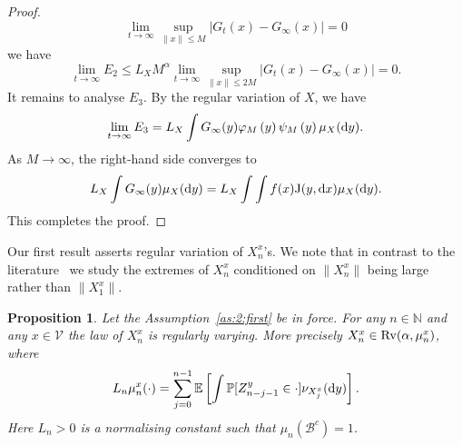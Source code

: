 \documentclass[preprint,12pt]{elsarticle}
\newtheorem{prop}[thm]{Proposition}
\theoremstyle{definition}
\theoremstyle{remark}
\newcommand{\bfx}{{ x}}
\newcommand{\xbf}{{ x}}
\newcommand{\ybf}{{ y}}
\newcommand{\Xbf}{{ X}}
\newcommand{\Zbf}{{ Z}}
\newcommand{\bfy}{{ y}}
\newcommand{\1}{{\mathbf 1}}
\numberwithin{equation}{section}
\newcommand{\Ebb}{\mathbb{E}}  %
\newcommand{\Nbb}{\mathbb{N}}
\newcommand{\Pbb}{\mathbb{P}}
\newcommand{\ud}{{\rm d}}
\newcommand{\Krm}{{\rm J}}
\newcommand{\Rvrm}{{\rm Rv}}
\newcommand{\Vcal}{\mathcal{V}}
\newcommand{\Bcal}{\mathcal{B}}
\begin{document}
\begin{proof}
\begin{equation*}
      \lim_{t \to \infty} \sup_{\|\bfx\| \leq M} \left| G_t(\bfx) - G_\infty(\bfx) \right| = 0 
    \end{equation*}  
    we have 
    \begin{equation*}
      \lim_{t\to \infty} E_2 \le L_{\Xbf} M^{\alpha} 
      \lim_{t\to \infty} \sup_{\|\xbf\| \le 2M} \left|G_t(\xbf) - G_\infty (\xbf)\right| =0.
    \end{equation*}
    It remains to analyse \( E_3 \). By the regular variation of \(\Xbf\), we have  
    \begin{equation*}  
      \lim_{t \to \infty} E_3 = 
      L_\Xbf \int G_\infty(\bfy) \varphi_M\left(\bfy\right) 
      \psi_M\left(\bfy\right) \mu_\Xbf(\ud \bfy).  
    \end{equation*}  
    As \( M \to \infty \), the right-hand side converges to  
    \begin{equation*}  
      L_\Xbf \int G_\infty(\bfy) \mu_\Xbf(\ud \bfy) = 
      L_\Xbf \int \int f(\bfx) \Krm(\bfy,\ud \bfx) \mu_\Xbf(\ud \bfy).  
    \end{equation*}  
    This completes the proof.
  \end{proof}

  Our first result asserts regular variation of 
  $\Xbf_n^\xbf$'s. We note that in contrast to the 
  literature~\cite{BASRAK20091055,janssen2014markov} we study the extremes of
  $\Xbf_n^\xbf$ conditioned on $\|\Xbf_n^{\xbf}\|$ being large rather than $\|\Xbf_1^\xbf\|$.

  \begin{prop}\label{prop:2:xn}
    Let the Assumption~\ref{as:2:first} be in force. For any 
    $n \in \Nbb$ and any $\xbf \in \Vcal$ the law of $\Xbf_n^\xbf$ 
    is regularly varying. More precisely 
    $\Xbf_n^\xbf\in \Rvrm(\alpha, \mu^{\xbf}_n)$, 
    where
    \begin{equation*}
		L_n \mu^\xbf_n (\cdot)
		= \sum_{j=0}^{n-1} \Ebb \left[ \int \Pbb[ \Zbf_{n-j-1}^\ybf \in \cdot] 
		\nu_{\Xbf^\xbf_j} (\ud \ybf) \right].  
    \end{equation*}
    Here $L_n>0$ is a normalising constant such that $\mu_n(\Bcal^c)=1$. 
  \end{prop}
\end{document}

